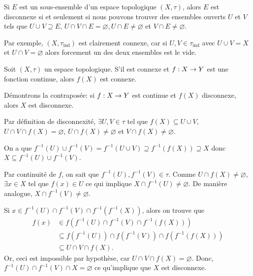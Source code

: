 \documentclass[french]{article}
\begin{document}
\begin{lemme}
 Si $E$ est un sous-ensemble d'un espace topologique $(X, \tau)$, alors $E$ est disconnexe si et seulement si nous pouvons trouver des ensembles ouverts  $U$ et $V$ tels que $U \cup V \supseteq E$, $U \cap V \cap E = \varnothing , U \cap E \not = \varnothing$ et $V \cap E \not = \varnothing$.
\end{lemme}
Par exemple, $(X, \tau_\mathrm{ind})$ est clairement connexe, car si $U, V \in \tau_\mathrm{ind}$ avec $U \cup V = X$ et $U \cap V = \varnothing $ alors forcement un des deux ensembles est le vide.

\begin{theoreme}
  Soit $(X, \tau)$ un espace topologique. S'il est connexe et $f: X \rightarrow Y$ est une fonction continue, alors $f(X)$ est connexe.

  \tcblower
  \begin{preuve}
    Démontrons la contraposée: si $f: X \rightarrow Y$ est continue et $f(X)$ disconnexe, alors $X$ est disconnexe.
    \par Par définition de disconnexité, $\exists U, V \in \tau$ tel que $f(X) \subseteq U \cup V$, $U \cap V \cap f(X) = \varnothing$, $U \cap f(X) \not = \varnothing $ et $V \cap f(X) \not = \varnothing $.
    \par On a que $f^{-1}(U) \cup f^{-1}(V) = f^{-1}(U \cup V) \supseteq f^{-1}\left( f(X) \right) \supseteq X$ donc $X \subseteq f^{-1}(U) \cup f^{-1}(V)$.
    \par Par continuité de $f$, on sait que  $f^{-1}(U), f^{-1}(V) \in \tau$. Comme $U \cap f(X) \not = \varnothing $, $\exists x \in X$ tel que $f(x) \in U$ ce qui implique $X \cap f^{-1}(U) \not = \varnothing $. De manière analogue, $X \cap f^{-1}(V) \not = \varnothing$.
    \par Si $x \in f^{-1}(U) \cap f^{-1}(V) \cap f^{-1}\left( f^{-1}(X) \right)$, alors on trouve que
    \begin{align*}
      f(x) &\in f \left( f^{-1}(U) \cap f^{-1}(V) \cap f^{-1}(f(X)) \right) \\
           &\subseteq f(f^{-1}(U)) \cap f(f^{-1}(V)) \cap f(f^{-1}(f(X))) \\
           &\subseteq U \cap V \cap f(X).
    \end{align*}
    Or, ceci est impossible par hypothèse, car $U \cap V \cap f(X) = \varnothing$. Donc, $f^{-1}(U) \cap f^{-1}(V) \cap X = \varnothing $ ce qu'implique que $X$ est disconnexe.
  \end{preuve}
\end{theoreme}
\end{document}

